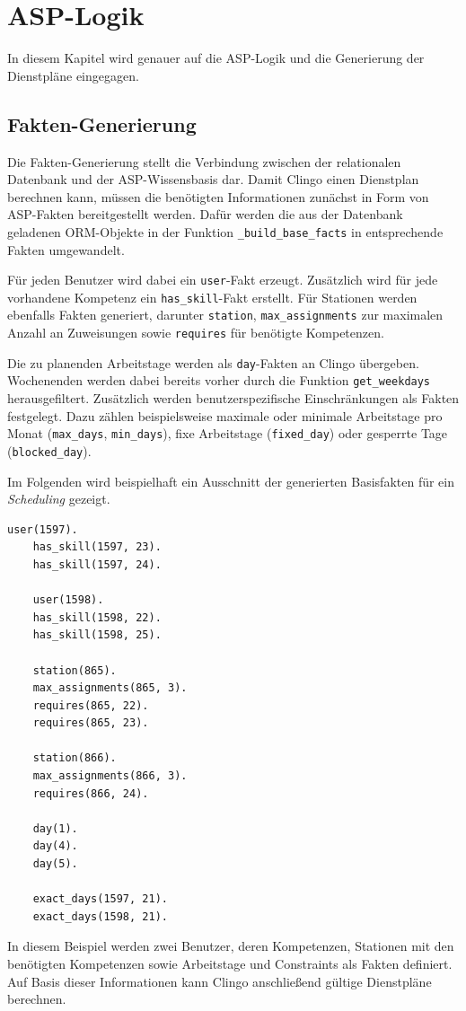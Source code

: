 \cleardoubleoddpage%
\chapter{ASP-Logik}
In diesem Kapitel wird genauer auf die ASP-Logik und die Generierung der Dienstpläne eingegagen.
\section{Fakten-Generierung}
Die Fakten-Generierung stellt die Verbindung zwischen der relationalen Datenbank und der ASP-Wissensbasis dar. Damit Clingo einen Dienstplan berechnen kann, müssen die benötigten Informationen zunächst in Form von ASP-Fakten bereitgestellt werden. Dafür werden die aus der Datenbank geladenen ORM-Objekte in der Funktion \texttt{\_build\_base\_facts} in entsprechende Fakten umgewandelt.

Für jeden Benutzer wird dabei ein \texttt{user}-Fakt erzeugt. Zusätzlich wird für jede vorhandene Kompetenz ein \texttt{has\_skill}-Fakt erstellt. Für Stationen werden ebenfalls Fakten generiert, darunter \texttt{station}, \texttt{max\_assignments} zur maximalen Anzahl an Zuweisungen sowie \texttt{requires} für benötigte Kompetenzen.

Die zu planenden Arbeitstage werden als \texttt{day}-Fakten an Clingo übergeben. Wochenenden werden dabei bereits vorher durch die Funktion \texttt{get\_weekdays} herausgefiltert. Zusätzlich werden benutzerspezifische Einschränkungen als Fakten festgelegt. Dazu zählen beispielsweise maximale oder minimale Arbeitstage pro Monat (\texttt{max\_days}, \texttt{min\_days}), fixe Arbeitstage (\texttt{fixed\_day}) oder gesperrte Tage (\texttt{blocked\_day}).

Im Folgenden wird beispielhaft ein Ausschnitt der generierten Basisfakten für ein \textit{Scheduling} gezeigt. 

\begin{lstlisting}[caption={Beispiel generierter Basisfakten},label={lst}]
	user(1597).
	has_skill(1597, 23).
	has_skill(1597, 24).
	
	user(1598).
	has_skill(1598, 22).
	has_skill(1598, 25).
	
	station(865).
	max_assignments(865, 3).
	requires(865, 22).
	requires(865, 23).
	
	station(866).
	max_assignments(866, 3).
	requires(866, 24).
	
	day(1).
	day(4).
	day(5).
	
	exact_days(1597, 21).
	exact_days(1598, 21).
\end{lstlisting}
In diesem Beispiel werden zwei Benutzer, deren Kompetenzen, Stationen mit den benötigten Kompetenzen sowie Arbeitstage und Constraints als Fakten definiert. Auf Basis dieser Informationen kann Clingo anschließend gültige Dienstpläne berechnen.

